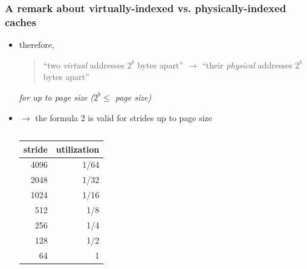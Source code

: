 \documentclass[12pt,dvipdfmx]{beamer}
\newcommand{\ao}[1]{{\color{blue}#1}}
\begin{document}
\begin{frame}
  \frametitle{A remark about virtually-indexed vs. physically-indexed caches}
  \begin{itemize}
  \item therefore,
    \begin{quote}
      ``two \ao{\em virtual} addresses $2^{b}$ bytes apart''
      $\rightarrow$
      ``their \ao{\em physical} addresses $2^{b}$ bytes apart''
    \end{quote}
    \ao{\it for up to page size ($2^b \leq$ page size)}
  \item $\rightarrow$ the formula 2 is valid
    for strides up to page size

    \begin{columns}
      \begin{column}{0.3\textwidth}
    {\scriptsize
      \begin{tabular}{|r|r|}\hline
        stride & utilization \\\hline
        4096   & 1/64 \\
        2048   & 1/32 \\
        1024   & 1/16 \\
        512    & 1/8 \\
        256    & 1/4 \\
        128    & 1/2 \\
        64     & 1 \\
        \hline
      \end{tabular}}
  \end{column}
  \begin{column}{0.7\textwidth}
\def\svgwidth{1.0\textwidth}
{\tiny}
  \end{column}  
    \end{columns}
  \end{itemize}
\end{frame}
\end{document}
